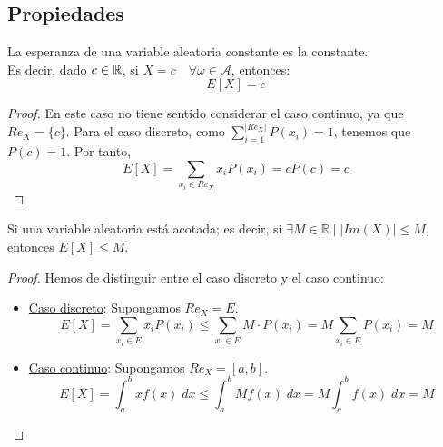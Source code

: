 \subsection{Propiedades}

\begin{prop}
    La esperanza de una variable aleatoria constante es la constante.\\
    Es decir, dado $c\in \mathbb R$, si $X=c\quad \forall \omega \in \mathcal{A}$, entonces:
    \begin{equation*}
        E[X]=c
    \end{equation*}
\end{prop}
\begin{proof}
    En este caso no tiene sentido considerar el caso continuo, ya que $Re_X=\{c\}$. Para el caso discreto, como $\displaystyle \sum_{i=1}^{|Re_X|}P(x_i)=1$, tenemos que $P(c)=1$. Por tanto,
    \begin{equation*}
        E[X]=\sum_{x_i\in Re_X}x_iP(x_i) = cP(c)=c
    \end{equation*}
\end{proof}

\begin{prop}
    Si una variable aleatoria está acotada; es decir, si $\exists M\in \mathbb{R}\mid |Im(X)|\leq M$, entonces $E[X]\leq M$.
\end{prop}
\begin{proof}
    Hemos de distinguir entre el caso discreto y el caso continuo:
    \begin{itemize}
        \item \underline{Caso discreto}: Supongamos $Re_X = E$.
        \begin{equation*}
            E[X] = \sum_{x_i\in E} x_iP(x_i) \leq \sum_{x_i\in E} M\cdot P(x_i) = 
            M\sum_{x_i\in E} P(x_i) = M
        \end{equation*}

        \item \underline{Caso continuo}: Supongamos $Re_X = [a,b]$.
        \begin{equation*}
            E[X] = \int_a^b xf(x)\;dx
            \leq \int_a^b Mf(x)\;dx = M\int_a^b f(x)\;dx = M
        \end{equation*}
    \end{itemize}
\end{proof}

